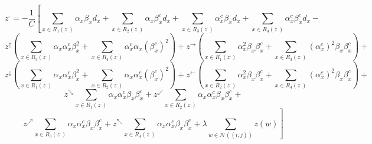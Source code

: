 \documentclass[11pt]{article}
\begin{document}
\begin{displaymath}
	z^{\cdot}=-\frac{1}{C}\left[ \sum_{x\in R_{1}(z^{\cdot})}\alpha_{x}\beta_{x}d_{x} + \sum_{x\in R_{2}(z^{\cdot})}\alpha_{x}\beta_{x}^{c}d_{x}  + \sum_{x\in R_{3}(z^{\cdot})}\alpha_{x}^{c}\beta_{x}d_{x} + \sum_{x\in R_{4}(z^{\cdot})}\alpha_{x}^{c}\beta_{x}^{c}d_{x}\right.-
\end{displaymath}
\begin{displaymath}
	\left.z^{\uparrow}\left(\sum_{x\in R_{3}(z^{\cdot})}\alpha_{x}\alpha_{x}^{c}\beta_{x}^{2} + \sum_{x\in R_{4}(z^{\cdot})}\alpha_{x}^{c}\alpha_{x}(\beta_{x}^{c})^{2}\right)+z^{\rightarrow}\left(\sum_{x\in R_{1}(z^{\cdot})}\alpha_{x}^{2}\beta_{x}\beta_{x}^{c} + \sum_{x\in R_{3}(z^{\cdot})}(\alpha_{x}^{c})^{2}\beta_{x}\beta_{x}^{c}\right)+\right.
\end{displaymath}
\begin{displaymath}
	\left.z^{\downarrow}\left(\sum_{x\in R_{1}(z^{\cdot})}\alpha_{x}\alpha_{x}^{c}\beta_{x}^{2} + \sum_{x\in R_{2}(z^{\cdot})}\alpha_{x}\alpha_{x}^{c}(\beta_{x}^{c})^{2}\right)+z^{\leftarrow}\left(\sum_{x\in R_{2}(z^{\cdot})}\alpha_{x}^{2}\beta_{x}\beta_{x}^{c} + \sum_{x\in R_{4}(z^{\cdot})}(\alpha_{x}^{c})^{2}\beta_{x}\beta_{x}^{c}\right)+\right.
\end{displaymath}
\begin{displaymath}
	z^{\searrow}\sum_{x\in R_{1}(z^{\cdot})}\alpha_{x}\alpha_{x}^{c}\beta_{x}\beta_{x}^{c}+ z^{\swarrow}\sum_{x\in R_{2}(z^{\cdot})}\alpha_{x}\alpha_{x}^{c}\beta_{x}\beta_{x}^{c}+
\end{displaymath}
\begin{displaymath}
	\left.z^{\nearrow}\sum_{x\in R_{3}(z^{\cdot})}\alpha_{x}\alpha_{x}^{c}\beta_{x}\beta_{x}^{c}+ z^{\nwarrow}\sum_{x\in R_{4}(z^{\cdot})}\alpha_{x}\alpha_{x}^{c}\beta_{x}\beta_{x}^{c} + \lambda \sum_{w\in\mathcal{N}((i,j))}z(w)\right]
\end{displaymath}
\end{document}
